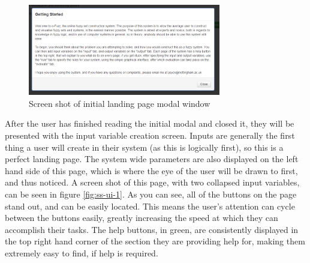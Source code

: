 \begin{figure}[ht!]
	\centering
	\includegraphics[width=0.75\textwidth]{images/ui-0}
	\vspace{-2mm}
	\caption{Screen shot of initial landing page modal window}
	\label{fig:ss-ui-0}
	\vspace{-1mm}
\end{figure}
\noindent 
After the user has finished reading the initial modal and closed it, they will be presented with the input variable creation screen. Inputs are generally the first thing a user will create in their system (as this is logically first), so this is a perfect landing page. The system wide parameters are also displayed on the left hand side of this page, which is where the eye of the user will be drawn to first, and thus noticed. A screen shot of this page, with two collapsed input variables, can be seen in figure \ref{fig:ss-ui-1}. As you can see, all of the buttons on the page stand out, and can be easily located. This means the user's attention can cycle between the buttons easily, greatly increasing the speed at which they can accomplish their tasks. The help buttons, in green, are consistently displayed in the top right hand corner of the section they are providing help for, making them extremely easy to find, if help is required.

